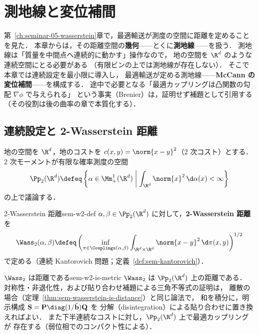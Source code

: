 \chapter{測地線と変位補間}
\label{ch:seminar-07-geodesics}

第~\ref{ch:seminar-05-wasserstein}章で，最適輸送が測度の空間に距離を定めることを見た．
本章からは，その距離空間の\textbf{幾何}——とくに\textbf{測地線}——を扱う．
測地線は「質量を中間点へ連続的に動かす」操作なので，
地の空間を $\R^d$ のような連続空間にとる必要がある
（有限ビンの上では測地線が存在しない）．
そこで本章では連続設定を最小限に導入し，
最適輸送が定める測地線——\textbf{McCann の変位補間}——を構成する．
途中で必要となる「最適カップリングは凸関数の勾配 $\nabla\phi$ で与えられる」
という事実（Brenier）は，証明せず補題として引用する
（その役割は後の曲率の章で本質化する）．

\section{連続設定と 2-Wasserstein 距離}
\label{sec:sem-continuous-w2}

地の空間を $\R^d$，地のコストを $c(x,y) = \norm{x-y}^2$（2 次コスト）とする．
2 次モーメントが有限な確率測度の空間
\[
  \Pp_2(\R^d)
  \defeq
  \left\{
    \alpha \in \Mm_+^1(\R^d)
    \;\middle|\;
    \int_{\R^d} \norm{x}^2 \,\d\alpha(x) < \infty
  \right\}
\]
の上で議論する．

\begin{definition}{2-Wasserstein 距離}{sem-w2-def}
  $\alpha, \beta \in \Pp_2(\R^d)$ に対して，\textbf{2-Wasserstein 距離}を
  \[
    \Wass_2(\alpha, \beta)
    \defeq
    \left(
      \inf_{\pi \in \Couplings(\alpha, \beta)}
      \int_{\R^d \times \R^d} \norm{x - y}^2 \,\d\pi(x, y)
    \right)^{1/2}
  \]
  で定める（連続 Kantorovich 問題；定義~\ref{def:sem-kantorovich}）．
\end{definition}

\begin{remark}{$\Wass_2$ は距離である}{sem-w2-is-metric}
  $\Wass_2$ は $\Pp_2(\R^d)$ 上の距離である．
  対称性・非退化性，および貼り合わせ補題による三角不等式の証明は，
  離散の場合（定理~\ref{thm:sem-wasserstein-is-distance}）と同じ論法で，
  和を積分に，明示構成
  $\mathbf{S} = \mathbf{P}\diag(1/\tilde{\mathbf{b}})\mathbf{Q}$ を
  分解（disintegration）による貼り合わせに置き換えればよい．
  また下半連続なコストに対し，$\Pp_2(\R^d)$ 上で最適カップリングが
  存在する（弱位相でのコンパクト性による）．
\end{remark}

